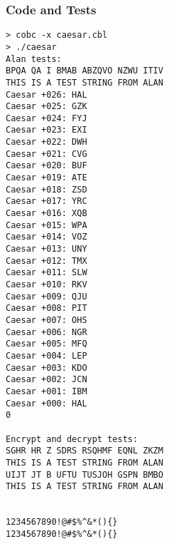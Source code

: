 \documentclass[letterpaper, 10pt, DIV=13]{scrartcl}
\numberwithin{equation}{section}
\numberwithin{figure}{section}
\numberwithin{table}{section}
\begin{document}
\subsubsection{Code and Tests}

\begin{lstlisting}[frame=single, caption = COBOL Output]  
> cobc -x caesar.cbl
> ./caesar
Alan tests:
BPQA QA I BMAB ABZQVO NZWU ITIV 
THIS IS A TEST STRING FROM ALAN 
Caesar +026: HAL                             
Caesar +025: GZK                             
Caesar +024: FYJ                             
Caesar +023: EXI                             
Caesar +022: DWH                             
Caesar +021: CVG                             
Caesar +020: BUF                             
Caesar +019: ATE                             
Caesar +018: ZSD                             
Caesar +017: YRC                             
Caesar +016: XQB                             
Caesar +015: WPA                             
Caesar +014: VOZ                             
Caesar +013: UNY                             
Caesar +012: TMX                             
Caesar +011: SLW                             
Caesar +010: RKV                             
Caesar +009: QJU                             
Caesar +008: PIT                             
Caesar +007: OHS                             
Caesar +006: NGR                             
Caesar +005: MFQ                             
Caesar +004: LEP                             
Caesar +003: KDO                             
Caesar +002: JCN                             
Caesar +001: IBM                             
Caesar +000: HAL                             
0
 
Encrypt and decrypt tests:
SGHR HR Z SDRS RSQHMF EQNL ZKZM 
THIS IS A TEST STRING FROM ALAN 
UIJT JT B UFTU TUSJOH GSPN BMBO 
THIS IS A TEST STRING FROM ALAN 
                                
                                
1234567890!@#$%^&*(){}          
1234567890!@#$%^&*(){}          
 

\end{lstlisting}
\end{document}
